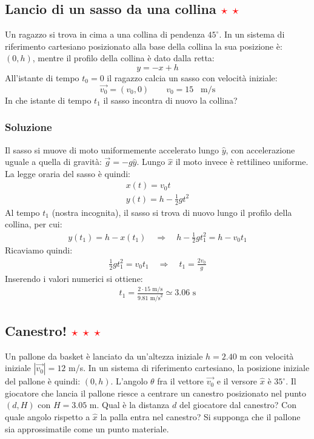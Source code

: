 \documentclass[12pt,a4paper]{book}
\newcommand{\rstar}{ \textcolor{red}{$\star$}}
\begin{document}
\subsection{Lancio di un sasso da una collina \rstar\rstar}
Un ragazzo si trova in cima a una collina di pendenza $45^\circ$.
In un sistema di riferimento cartesiano posizionato alla 
base della collina la sua posizione è: $(0,h)$, mentre il profilo della collina è dato dalla retta:
%
\begin{equation*}
y=-x+h
\end{equation*} 
%
All'istante di tempo $t_0=0$ il ragazzo calcia
un sasso con velocità iniziale:
%
\begin{equation*}
\vec{v_0}=(v_0,0) \qquad v_0=15 \; \; \; \text{m/s}
\end{equation*} 
%
In che istante di tempo $t_1$ il sasso incontra di nuovo la collina?

\subsubsection*{Soluzione}
Il sasso si muove di moto uniformemente accelerato lungo $\hat{y}$, con accelerazione uguale a quella di gravità: $\vec{g}=-g \hat{y}$. Lungo $\hat{x}$ il moto invece è rettilineo uniforme. La legge oraria del sasso è quindi: 
%
\begin{gather*}
x(t)= v_0 t \\
y(t)= h - \frac{1}{2} g t^2
\end{gather*} 
%
Al tempo $t_1$ (nostra incognita), il sasso si trova di nuovo 
lungo il profilo della collina, per cui:
%
\begin{gather*}
y(t_1)=h- x(t_1) \quad \Rightarrow \quad h - \frac{1}{2} g t_1^2=h- v_0 t_1
\end{gather*} 
%
Ricaviamo quindi:
%
\begin{gather*}
 \frac{1}{2} g t_1^2= v_0 t_1  \quad \Rightarrow \quad t_1= \frac{2 v_0}{g}
\end{gather*} 
%
Inserendo i valori numerici si ottiene: 
%
\begin{gather*}
t_1= \frac{2\cdot 15 \text{  m/s}}{9.81 \text{  m/s}^2} \simeq 3.06 \text{  s}
\end{gather*} 
%

\subsection{Canestro! \rstar\rstar\rstar} 
Un pallone da basket è lanciato da un'altezza iniziale $h=2.40$ m con velocità iniziale $|\vec{v_0}|=12$ m/s. 
In un sistema di riferimento cartesiano, la posizione iniziale del pallone è quindi: $(0,h)$. L'angolo $\theta$ fra il vettore $\vec{v_0}$ e il versore $\hat{x}$ è $35^\circ$. Il giocatore che lancia il pallone riesce a centrare un canestro posizionato nel punto $(d,H)$ con $H=3.05$ m.  Qual è la distanza $d$ del giocatore dal canestro? Con quale angolo rispetto a $\hat{x}$ la palla entra nel canestro? Si supponga che il pallone sia approssimatile come un punto materiale. 
\end{document}
